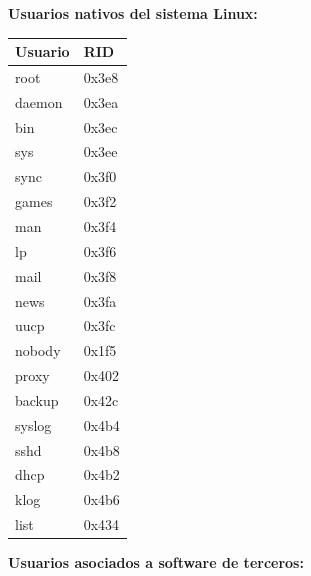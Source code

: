 \documentclass[11pt,oneside,a4paper]{book}
\begin{document}
\textbf{Usuarios nativos del sistema Linux:}
\begin{table}[h]
    \renewcommand{\arraystretch}{1.3}
    \centering
    \begin{tabular}{|l|l|}
        \hline
        \rowcolor{heading-grey} \textbf{Usuario} & \textbf{RID} \\ \hline
        root          & 0x3e8 \\ \hline
        daemon        & 0x3ea \\ \hline
        bin           & 0x3ec \\ \hline
        sys           & 0x3ee \\ \hline
        sync          & 0x3f0 \\ \hline
        games         & 0x3f2 \\ \hline
        man           & 0x3f4 \\ \hline
        lp            & 0x3f6 \\ \hline
        mail          & 0x3f8 \\ \hline
        news          & 0x3fa \\ \hline
        uucp          & 0x3fc \\ \hline
        nobody        & 0x1f5 \\ \hline
        proxy         & 0x402 \\ \hline
        backup        & 0x42c \\ \hline
        syslog        & 0x4b4 \\ \hline
        sshd          & 0x4b8 \\ \hline
        dhcp          & 0x4b2 \\ \hline
        klog          & 0x4b6 \\ \hline
        list          & 0x434 \\ \hline
    \end{tabular}
\end{table}
\newpage
\textbf{Usuarios asociados a software de terceros:}
\end{document}
